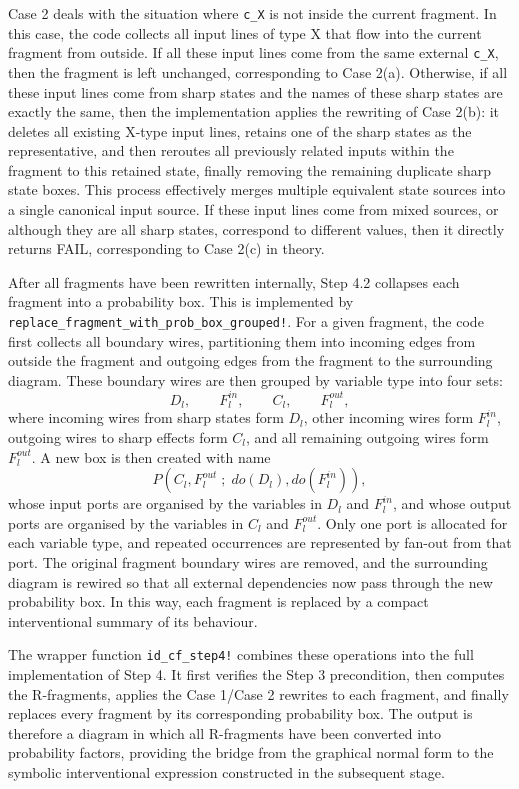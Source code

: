 \documentclass[a4paper]{report}
\begin{document}
Case 2 deals with the situation where \texttt{c\_X} is not inside the current fragment. In this case, the code collects all input lines of type X that flow into the current fragment from outside. If all these input lines come from the same external \texttt{c\_X}, then the fragment is left unchanged, corresponding to Case 2(a). Otherwise, if all these input lines come from sharp states and the names of these sharp states are exactly the same, then the implementation applies the rewriting of Case 2(b): it deletes all existing X-type input lines, retains one of the sharp states as the representative, and then reroutes all previously related inputs within the fragment to this retained state, finally removing the remaining duplicate sharp state boxes. This process effectively merges multiple equivalent state sources into a single canonical input source. If these input lines come from mixed sources, or although they are all sharp states, correspond to different values, then it directly returns FAIL, corresponding to Case 2(c) in theory.


After all fragments have been rewritten internally, Step 4.2 collapses each fragment into a probability box. 
This is implemented by \texttt{replace\_fragment\_with\_prob\_box\_grouped!}. For a given fragment, the code first collects all boundary wires, partitioning them into incoming edges from outside the fragment and outgoing edges from the fragment to the surrounding diagram. 
These boundary wires are then grouped by variable type into four sets:
\[
D_l,\qquad F_l^{in},\qquad C_l,\qquad F_l^{out},
\]
where incoming wires from sharp states form $D_l$, other incoming wires form $F_l^{in}$, outgoing wires to sharp effects form $C_l$, and all remaining outgoing wires form $F_l^{out}$. A new box is then created with name
\[
P(C_l, F_l^{out} \; ; \; do(D_l), do(F_l^{in})),
\]
whose input ports are organised by the variables in $D_l$ and $F_l^{in}$, and whose output ports are organised by the variables in $C_l$ and $F_l^{out}$. Only one port is allocated for each variable type, and repeated occurrences are represented by fan-out from that port. The original fragment boundary wires are removed, and the surrounding diagram is rewired so that all external dependencies now pass through the new probability box. 
In this way, each fragment is replaced by a compact interventional summary of its behaviour.

The wrapper function \texttt{id\_cf\_step4!} combines these operations into the full implementation of Step 4. It first verifies the Step 3 precondition, then computes the R-fragments, applies the Case 1/Case 2 rewrites to each fragment, and finally replaces every fragment by its corresponding probability box. The output is therefore a diagram in which all R-fragments have been converted into probability factors, providing the bridge from the graphical normal form to the symbolic interventional expression constructed in the subsequent stage.
\end{document}
